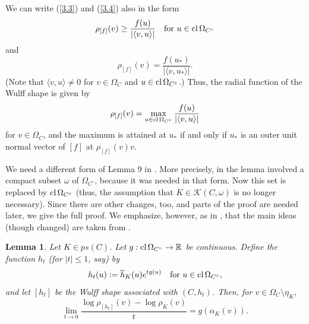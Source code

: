 \documentclass[12pt]{article}
\newcommand{\0}{\mbox{\boldmath$o$}}
\newcommand{\R}{{\mathbb R}}
\newcommand{\K}{{\mathcal K}}
\newtheorem{lemma}{Lemma}%
\begin{document}
We can write (\ref{3.3}) and (\ref{3.4}) also in the form
\begin{equation}\label{3.3a}
\rho_{[f]}(v) \ge \frac{f(u)}{|\langle v,u\rangle|} \quad \mbox{for }u\in{\rm cl}\,\Omega_{C^\circ}
\end{equation}
and
\begin{equation}\label{3.3b}
\rho_{[f]}(v) =\frac{f(u_*)}{|\langle v,u_*\rangle|}.
\end{equation}
(Note that $\langle v,u\rangle\not=0$ for $v\in\Omega_C$ and $u\in{\rm cl}\,\Omega_{C^\circ}$.) Thus, the radial function of the Wulff shape is given by
$$ \rho_{[f]}(v) = \max_{u\in{\rm cl}\,\Omega_{C^\circ}}\frac{f(u)}{|\langle v,u\rangle|}$$
for $v\in\Omega_C$, and the maximum is attained at $u_*$ if and only if $u_*$ is an outer unit normal vector of $[f]$ at $\rho_{[f]}(v)v$.

We need a different form of Lemma 9 in \cite{Sch24b}. More precisely, in \cite{Sch24b} the lemma involved a compact subset $\omega$ of $\Omega_{C^\circ}$, because it was needed in that form. Now this set is replaced by ${\rm cl}\,\Omega_{C^\circ}$ (thus, the assumption that $K\in\K(C,\omega)$ is no longer necessary). Since there are other changes, too, and parts of the proof are needed later, we give the full proof. We emphasize, however, as in \cite{Sch24b}, that the main ideas (though changed) are taken from \cite{HLYZ16}.

\begin{lemma}\label{L3.1}
Let $K\in ps(C)$. Let $g:{\rm cl}\,\Omega_{C^\circ}\to \R$ be continuous. Define the function $h_t$ (for $|t|\le 1$, say) by
$$ h_t(u) := \overline h_K(u)e^{tg(u)}\quad\mbox{for }u\in{\rm cl}\,\Omega_{C^\circ},$$
and let $[h_t]$ be the Wulff shape associated with $(C,h_t)$. Then, for $v\in\Omega_C\setminus \eta_K$,
$$ \lim_{t\to 0} \frac{\log \rho_{[h_t]}(v) - \log\rho_K(v)}{t}= g(\alpha_K(v)).$$
\end{lemma}
\end{document}
